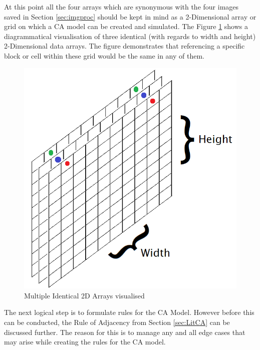 At this point all the four arrays which are synonymous with the four images saved in Section \ref{sec:imgproc} should be kept in mind as a 2-Dimensional array or grid on which a CA model can be created and simulated. The Figure \ref{fig:gridlayers} shows a diagrammatical visualisation of three identical (with regards to width and height) 2-Dimensional data arrays. The figure demonstrates that referencing a specific block or cell within these grid would be the same in any of them.
\begin{figure}[H]
\centering
\includegraphics[scale=0.8]{Figures/Chapter3/gridlayers}
\caption{Multiple Identical 2D Arrays visualised}
\label{fig:gridlayers}
\end{figure}
The next logical step is to formulate rules for the CA Model. However before this can be conducted, the Rule of Adjacency from Section \ref{sec:LitCA} can be discussed further. The reason for this is to manage any and all edge cases that may arise while creating the rules for the CA model.

